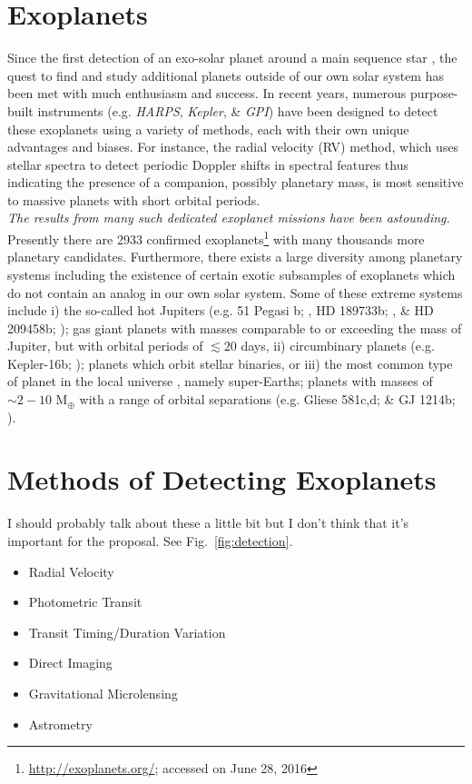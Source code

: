 \section{Exoplanets} \label{sect:exoplanets}
Since the first detection of an exo-solar planet around a main sequence star 
\citep{mayor95}, 
the quest to find and study additional planets outside of our own solar system 
has been met with much enthusiasm and success. In recent years, numerous 
purpose-built instruments (e.g. \emph{HARPS}, 
\emph{Kepler}, \& \emph{GPI}) 
have been designed 
to detect these exoplanets using a variety of methods, each with their own 
unique advantages and biases. 
For instance, the radial velocity (RV) method, which uses stellar spectra to 
detect periodic Doppler 
shifts in spectral features thus indicating the presence of 
a companion, possibly planetary mass, is most sensitive to massive planets 
with short orbital periods.  \\

\emph{The results from many such dedicated exoplanet missions have been 
astounding.} Presently there are 2933 confirmed 
exoplanets\footnote{\url{http://exoplanets.org/}; accessed on June 28, 2016} 
with many thousands more planetary candidates. Furthermore, there 
exists a large diversity among planetary systems including the existence 
of certain exotic subsamples of exoplanets which do not contain an analog in 
our own solar system. Some of these extreme systems include i) the so-called hot 
Jupiters (e.g. 51 Pegasi b; \cite{mayor95}, HD 189733b; \cite{bouchy05}, 
\& HD 209458b; \cite{mazeh99, charbonneau00}); 
gas giant planets with masses comparable to or exceeding the mass of Jupiter, 
but with orbital periods of $\lesssim 20$ days, ii) circumbinary planets (e.g. 
Kepler-16b; \cite{doyle11}); 
planets which orbit stellar binaries, or iii) the most common type of 
planet in the local universe \parencite{petigura13}, 
namely super-Earths; planets with masses of 
$\sim 2-10$ M$_{\oplus}$ with a range of orbital separations (e.g. 
Gliese 581c,d; \cite{udry07} \& GJ 1214b; \cite{charbonneau09}).

\section{Methods of Detecting Exoplanets} \label{sect:detection}
I should probably talk about these a little bit but I don't think that it's 
important for the proposal. See Fig.~\ref{fig:detection}.
\begin{itemize}
\item Radial Velocity
\item Photometric Transit
\item Transit Timing/Duration Variation
\item Direct Imaging
\item Gravitational Microlensing
\item Astrometry
\end{itemize}

